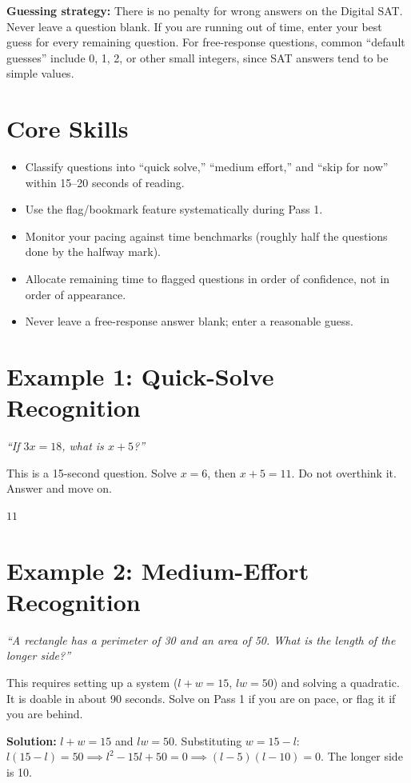\documentclass[14pt]{extarticle}
\begin{document}
\textbf{Guessing strategy:} There is no penalty for wrong answers on the Digital SAT. Never leave a question blank. If you are running out of time, enter your best guess for every remaining question. For free-response questions, common ``default guesses'' include 0, 1, 2, or other small integers, since SAT answers tend to be simple values.

\section*{Core Skills}
\begin{itemize}
  \item Classify questions into ``quick solve,'' ``medium effort,'' and ``skip for now'' within 15--20 seconds of reading.
  \item Use the flag/bookmark feature systematically during Pass 1.
  \item Monitor your pacing against time benchmarks (roughly half the questions done by the halfway mark).
  \item Allocate remaining time to flagged questions in order of confidence, not in order of appearance.
  \item Never leave a free-response answer blank; enter a reasonable guess.
\end{itemize}

\section*{Example 1: Quick-Solve Recognition}

\textit{``If \(3x = 18\), what is \(x + 5\)?''}

This is a 15-second question. Solve \(x = 6\), then \(x + 5 = 11\). Do not overthink it. Answer and move on.

\(\boxed{11}\)

\section*{Example 2: Medium-Effort Recognition}

\textit{``A rectangle has a perimeter of 30 and an area of 50. What is the length of the longer side?''}

This requires setting up a system (\(l + w = 15\), \(lw = 50\)) and solving a quadratic. It is doable in about 90 seconds. Solve on Pass 1 if you are on pace, or flag it if you are behind.

\textbf{Solution:} \(l + w = 15\) and \(lw = 50\). Substituting \(w = 15 - l\): \(l(15 - l) = 50 \implies l^2 - 15l + 50 = 0 \implies (l - 5)(l - 10) = 0\). The longer side is 10.
\end{document}

